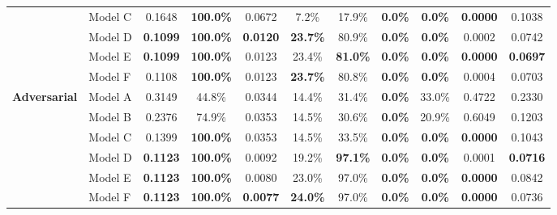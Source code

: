 \begin{table}[H]
{\begin{tabular}{llccccccccc}
& Model C  & 0.1648          & \textbf{100.0\%} & 0.0672          & 7.2\%           & 17.9\%          & \textbf{0.0\%} & \textbf{0.0\%} & \textbf{0.0000} & 0.1038 \\
& Model D  & \textbf{0.1099} & \textbf{100.0\%} & \textbf{0.0120} & \textbf{23.7\%} & 80.9\%          & \textbf{0.0\%} & \textbf{0.0\%} & 0.0002          & 0.0742 \\
& Model E  & \textbf{0.1099} & \textbf{100.0\%} & 0.0123          & 23.4\%          & \textbf{81.0\%} & \textbf{0.0\%} & \textbf{0.0\%} & \textbf{0.0000} & \textbf{0.0697} \\
& Model F  & 0.1108          & \textbf{100.0\%} & 0.0123          & \textbf{23.7\%} & 80.8\%          & \textbf{0.0\%} & \textbf{0.0\%} & 0.0004          & 0.0703 \\
\midrule
\multirow{6}{*}{\textbf{Adversarial}} 
& Model A  & 0.3149          & 44.8\%           & 0.0344          & 14.4\%          & 31.4\%          & \textbf{0.0\%} & 33.0\%         & 0.4722          & 0.2330 \\
& Model B  & 0.2376          & 74.9\%           & 0.0353          & 14.5\%          & 30.6\%          & \textbf{0.0\%} & 20.9\%         & 0.6049          & 0.1203 \\
& Model C  & 0.1399          & \textbf{100.0\%} & 0.0353          & 14.5\%          & 33.5\%          & \textbf{0.0\%} & \textbf{0.0\%} & \textbf{0.0000} & 0.1043 \\
& Model D  & \textbf{0.1123} & \textbf{100.0\%} & 0.0092          & 19.2\%          & \textbf{97.1\%} & \textbf{0.0\%} & \textbf{0.0\%} & 0.0001          & \textbf{0.0716} \\
& Model E  & \textbf{0.1123} & \textbf{100.0\%} & 0.0080          & 23.0\%          & 97.0\%          & \textbf{0.0\%} & \textbf{0.0\%} & \textbf{0.0000} & 0.0842 \\
& Model F  & \textbf{0.1123} & \textbf{100.0\%} & \textbf{0.0077} & \textbf{24.0\%} & 97.0\%          & \textbf{0.0\%} & \textbf{0.0\%} & \textbf{0.0000} & 0.0736 \\
\bottomrule
\end{tabular}}
\end{table}

